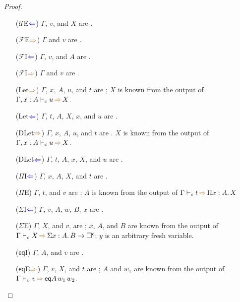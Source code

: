 \documentclass[a4,natbib=false]{article}
\newcommand{\ctov}{\mathcal{U}}
\newcommand{\vtoc}{\mathcal{F}}
\newcommand{\unicomp}{\square^{c}}
\newcommand{\sigmatype}[2]{\Sigma {#1}.\,#2}
\newcommand{\pitype}[2]{\Pi {#1}.\,#2}
\newcommand{\eqtype}[3]{\mathsf{eq}{#1}\,{#2}\,{#3}}
\newcommand{\checks}{{\color{blue} \Leftarrow}}
\newcommand{\infers}{{\color{brown} \Rightarrow}}
\newcommand{\judgecInfer}[3]{{#1} \vdash_{c} {#2} \, \infers \, {#3}}
\newcommand{\judgevInfer}[3]{{#1} \vdash_{v} {#2} \, \infers \, {#3}}
\begin{document}
\begin{proof}
\begin{multicols}{2}
\begin{itemize}
      \item[($\ctov$E$\checks$)]
        $\Gamma$, $v$, and $X$ are \fromconcl.

      \item[($\vtoc$E$\infers$)]
        $\Gamma$ and $v$ are \fromconcl.

      \item[($\vtoc$I$\checks$)]
        $\Gamma$, $v$, and $A$ are \fromconcl.

      \item[($\vtoc$I$\infers$)]
        $\Gamma$ and $v$ are \fromconcl.

      \item[(Let$\infers$)]
        $\Gamma$, $x$, $A$, $u$, and $t$ are \fromconcl;
        $X$ is known from the output of $\judgecInfer{\Gamma, x : A}{u}{X}$.
        
      \item[(Let$\checks$)]
        $\Gamma$, $t$, $A$, $X$, $x$, and $u$ are \fromconcl.

      \item[(DLet$\infers$)]
        $\Gamma$, $x$, $A$, $u$, and $t$ are \fromconcl.
        $X$ is known from the output of $\judgecInfer{\Gamma, x:A}{u}{X}$.

      \item[(DLet$\checks$)]
        $\Gamma$, $t$, $A$, $x$, $X$, and $u$ are \fromconcl.

      \item[($\Pi$I$\checks$)]
        $\Gamma$, $x$, $A$, $X$, and $t$ are \fromconcl.

      \item[($\Pi$E)]
        $\Gamma$, $t$, and $v$ are \fromconcl;
        $A$ is known from the output of $\judgecInfer{\Gamma}{t}{\pitype{x:A}{X}}$

      \item[($\Sigma$I$\checks$)]
        $\Gamma$, $v$, $A$, $w$, $B$, $x$ are \fromconcl.

      \item[($\Sigma$E)]
        $\Gamma$, $X$, and $v$, are \fromconcl;
        $x$, $A$, and $B$ are known from the output of
        $\judgecInfer{\Gamma}{X}{\sigmatype{x:A}{B} \to \unicomp}$;
        $y$ is an arbitrary fresh variable.
        
      \item[($\mathsf{eq}$I)]
        $\Gamma$, $A$, and $v$ are \fromconcl.

      \item[($\mathsf{eq}$E$\infers$)]
        $\Gamma$, $v$, $X$, and $t$ are \fromconcl;
        $A$ and $w_1$ are known from the output of $\judgevInfer{\Gamma}{v}{\eqtype{A}{w_1}{w_2}}$.
  \end{itemize}
  \end{multicols}


\end{proof}
\end{document}
